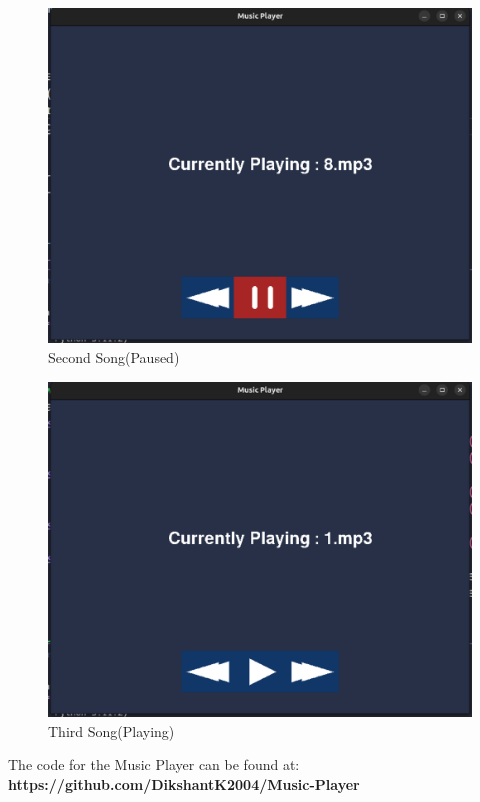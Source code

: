 \documentclass[journal,12pt,twocolumn]{IEEEtran}
\begin{document}
\begin{figure}[h!]
        \includegraphics[scale = 0.25]{figs/img2}
        \caption{Second Song(Paused)}
        \label{fig:2}
\end{figure}

\begin{figure}[h!]
       \includegraphics[scale = 0.25]{figs/img3}
        \caption{Third Song(Playing)}
        \label{fig:3}
\end{figure}

The code for the Music Player can be found at:
\textbf{https://github.com/DikshantK2004/Music-Player}
\end{document}
